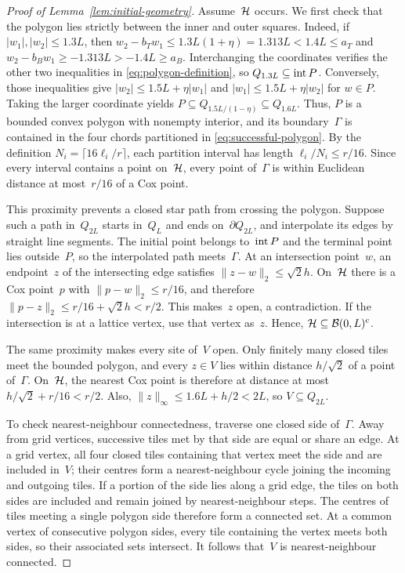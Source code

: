 \documentclass[11pt,letterpaper]{article}
\begin{document}
\begin{proof}[Proof of Lemma~\ref{lem:initial-geometry}]
Assume~$\mathcal H$ occurs. We first check that the polygon lies strictly between the inner and outer squares. Indeed, if $\lvert w_1\rvert,\lvert w_2\rvert\le1.3L$, then $w_2-b_Tw_1\le1.3L(1+\eta)=1.313L<1.4L\le a_T$ and $w_2-b_Bw_1\ge-1.313L>-1.4L\ge a_B$. Interchanging the coordinates verifies the other two inequalities in \eqref{eq:polygon-definition}, so $Q_{1.3L}\subseteq\operatorname{int} P$. Conversely, those inequalities give $\lvert w_2\rvert\le1.5L+\eta\lvert w_1\rvert$ and $\lvert w_1\rvert\le1.5L+\eta\lvert w_2\rvert$ for $w\in P$. Taking the larger coordinate yields $P\subseteq Q_{1.5L/(1-\eta)}\subseteq Q_{1.6L}$. Thus, $P$ is a bounded convex polygon with nonempty interior, and its boundary~$\Gamma$ is contained in the four chords partitioned in \eqref{eq:successful-polygon}. By the definition $N_i=\lceil16\ell_i/r\rceil$, each partition interval has length $\ell_i/N_i\le r/16$. Since every interval contains a point on~$\mathcal H$, every point of~$\Gamma$ is within Euclidean distance at most~$r/16$ of a Cox point.

This proximity prevents a closed star path from crossing the polygon. Suppose such a path in~$Q_{2L}$ starts in~$Q_L$ and ends on~$\partial Q_{2L}$, and interpolate its edges by straight line segments. The initial point belongs to~$\operatorname{int} P$ and the terminal point lies outside~$P$, so the interpolated path meets~$\Gamma$. At an intersection point~$w$, an endpoint~$z$ of the intersecting edge satisfies $\lVert z-w\rVert_2\le\sqrt2h$. On~$\mathcal H$ there is a Cox point~$p$ with $\lVert p-w\rVert_2\le r/16$, and therefore $\lVert p-z\rVert_2\le r/16+\sqrt2h<r/2$. This makes~$z$ open, a contradiction. If the intersection is at a lattice vertex, use that vertex as~$z$. Hence, $\mathcal H\subseteq\mathcal B(0,L)^{\mathrm{c}}$.

The same proximity makes every site of~$V$ open. Only finitely many closed tiles meet the bounded polygon, and every $z\in V$ lies within distance $h/\sqrt2$ of a point of~$\Gamma$. On~$\mathcal H$, the nearest Cox point is therefore at distance at most $h/\sqrt2+r/16<r/2$. Also, $\lVert z\rVert_\infty\le1.6L+h/2<2L$, so $V\subseteq Q_{2L}$.

To check nearest-neighbour connectedness, traverse one closed side of~$\Gamma$. Away from grid vertices, successive tiles met by that side are equal or share an edge. At a grid vertex, all four closed tiles containing that vertex meet the side and are included in~$V$; their centres form a nearest-neighbour cycle joining the incoming and outgoing tiles. If a portion of the side lies along a grid edge, the tiles on both sides are included and remain joined by nearest-neighbour steps. The centres of tiles meeting a single polygon side therefore form a connected set. At a common vertex of consecutive polygon sides, every tile containing the vertex meets both sides, so their associated sets intersect. It follows that~$V$ is nearest-neighbour connected.


\end{proof}
\end{document}
